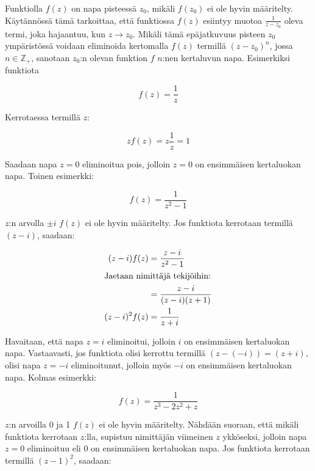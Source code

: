 \documentclass[../integrointiopas.tex]{subfiles}
\begin{document}
	Funktiolla $f(z)$ on napa pisteessä $z_0$, mikäli $f(z_0)$ ei ole hyvin määritelty. Käytännössä tämä tarkoittaa, että funktiossa $f(z)$ esiintyy muotoa $\frac{1}{z - z_0}$ oleva termi, joka hajaantuu, kun $z\to z_0$. Mikäli tämä epäjatkuvuus pisteen $z_0$ ympäristössä voidaan eliminoida kertomalla $f(z)$ termillä $(z - z_0)^n$, jossa $n\in\mathbb{Z}_+$, sanotaan $z_0$:n olevan funktion $f$ $n$:nen kertaluvun napa. Esimerkiksi funktiota
	
	\begin{equation}
		f(z) = \frac{1}{z}
	\end{equation}
	
	Kerrotaessa termillä $z$:
	
	\begin{equation}
		zf(z) = z\frac{1}{z} = 1
	\end{equation}

	Saadaan napa $z = 0$ eliminoitua pois, jolloin $z = 0$ on ensimmäisen kertaluokan napa. Toinen esimerkki:
	
	\begin{equation}
		f(z) = \frac{1}{z^2 - 1}
	\end{equation}

	$z$:n arvolla $\pm i$ $f(z)$ ei ole hyvin määritelty. Jos funktiota kerrotaan termillä $(z - i)$, saadaan:
	
	\begin{align}
		(z - i)f(z) &= \frac{z - i}{z^2 - 1} \\
		\intertext{Jaetaan nimittäjä tekijöihin:}
		&= \frac{z - i}{(z - i)(z + 1)} \\
		(z - i)^2f(z) &= \frac{1}{z + i}
	\end{align}

	Havaitaan, että napa $z = i$ eliminoitui, jolloin $i$ on ensimmäisen kertaluokan napa. Vastaavasti, jos funktiota olisi kerrottu termillä $(z - (-i)) = (z + i)$, olisi napa $z = -i$ eliminoitunut, jolloin myös $-i$ on ensimmäisen kertaluokan napa. Kolmas esimerkki:
	
	\begin{equation}
		f(z) = \frac{1}{z^3 - 2z^2 + z}
	\end{equation}

	$z$:n arvoilla 0 ja 1 $f(z)$ ei ole hyvin määritelty. Nähdään suoraan, että mikäli funktiota kerrotaan $z$:lla, supistuu nimittäjän viimeinen $z$ ykköseksi, jolloin napa $z = 0$ eliminoituu eli 0 on ensimmäisen kertaluokan napa. Jos funktiota kerrotaan termillä $(z - 1)^2$, saadaan:
	
\end{document}

